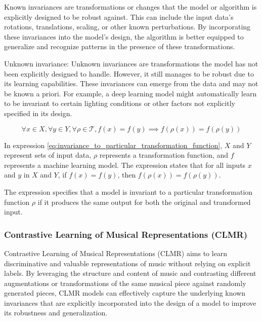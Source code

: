 \begin{definition}
Known invariances are transformations or changes that the model or algorithm is explicitly designed to be robust against. This can include the input data's rotations, translations, scaling, or other known perturbations. By incorporating these invariances into the model's design, the algorithm is better equipped to generalize and recognize patterns in the presence of these transformations.
\end{definition}

\begin{definition}

Unknown invariance: Unknown invariances are transformations the model has not been explicitly designed to handle. However, it still manages to be robust due to its learning capabilities. These invariances can emerge from the data and may not be known a priori. For example, a deep learning model might automatically learn to be invariant to certain lighting conditions or other factors not explicitly specified in its design.
\end{definition}

\begin{equation}
\label{eq:invariance_to_particular_transformation_function}
\forall x \in X, \forall y \in Y, \forall \rho \in \mathcal{T}, f(x) = f(y) \implies f(\rho(x)) = f(\rho(y))
\end{equation}

In expression \ref{eq:invariance_to_particular_transformation_function}, $X$ and $Y$ represent sets of input data, $\rho$ represents a transformation function, and $f$ represents a machine learning model. The expression states that for all inputs $x$ and $y$ in $X$ and $Y$, if $f(x) = f(y)$, then $f(\rho(x)) = f(\rho(y))$.

The expression specifies that a model is invariant to a particular transformation function $\rho$ if it produces the same output for both the original and transformed input.

\subsubsection{Contrastive Learning of Musical Representations (CLMR)}

Contrastive Learning of Musical Representations (CLMR) \cite{CLMR2021} aims to learn discriminative and valuable representations of music without relying on explicit labels. By leveraging the structure and content of music and contrasting different augmentations or transformations of the same musical piece against randomly generated pieces, CLMR models can effectively capture the underlying known invariances that are explicitly incorporated into the design of a model to improve its robustness and generalization.

